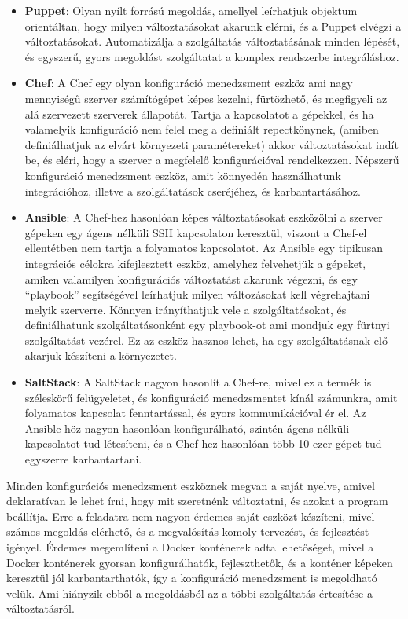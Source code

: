 \documentclass[11pt,magyar,a4paper,twoside,]{report}
\begin{document}
\begin{itemize}
\item
  \textbf{Puppet}\citep{puppet}: Olyan nyílt forrású megoldás, amellyel
  leírhatjuk objektum orientáltan, hogy milyen változtatásokat akarunk
  elérni, és a Puppet elvégzi a változtatásokat. Automatizálja a
  szolgáltatás változtatásának minden lépését, és egyszerű, gyors
  megoldást szolgáltatat a komplex rendszerbe integráláshoz.
\item
  \textbf{Chef}\citep{chef}: A Chef egy olyan konfiguráció menedzsment
  eszköz ami nagy mennyiségű szerver számítógépet képes kezelni,
  fürtözhető, és megfigyeli az alá szervezett szerverek állapotát.
  Tartja a kapcsolatot a gépekkel, és ha valamelyik konfiguráció nem
  felel meg a definiált repectkönynek, (amiben definiálhatjuk az elvárt
  környezeti paramétereket) akkor változtatásokat indít be, és eléri,
  hogy a szerver a megfelelő konfigurációval rendelkezzen. Népszerű
  konfiguráció menedzsment eszköz, amit könnyedén használhatunk
  integrációhoz, illetve a szolgáltatások cseréjéhez, és
  karbantartásához.
\item
  \textbf{Ansible}\citep{ansible}: A Chef-hez hasonlóan képes
  változtatásokat eszközölni a szerver gépeken egy ágens nélküli SSH
  kapcsolaton keresztül, viszont a Chef-el ellentétben nem tartja a
  folyamatos kapcsolatot. Az Ansible egy tipikusan integrációs célokra
  kifejlesztett eszköz, amelyhez felvehetjük a gépeket, amiken
  valamilyen konfigurációs változtatást akarunk végezni, és egy
  ``playbook'' segítségével leírhatjuk milyen változásokat kell
  végrehajtani melyik szerverre. Könnyen irányíthatjuk vele a
  szolgáltatásokat, és definiálhatunk szolgáltatásonként egy playbook-ot
  ami mondjuk egy fürtnyi szolgáltatást vezérel. Ez az eszköz hasznos
  lehet, ha egy szolgáltatásnak elő akarjuk készíteni a környezetet.
\item
  \textbf{SaltStack}\citep{saltstack}: A SaltStack nagyon hasonlít a
  Chef-re, mivel ez a termék is széleskörű felügyeletet, és konfiguráció
  menedzsmentet kínál számunkra, amit folyamatos kapcsolat
  fenntartással, és gyors kommunikációval ér el. Az Ansible-höz nagyon
  hasonlóan konfigurálható, szintén ágens nélküli kapcsolatot tud
  létesíteni, és a Chef-hez hasonlóan több 10 ezer gépet tud egyszerre
  karbantartani.
\end{itemize}

Minden konfigurációs menedzsment eszköznek megvan a saját nyelve, amivel
deklaratívan le lehet írni, hogy mit szeretnénk változtatni, és azokat a
program beállítja. Erre a feladatra nem nagyon érdemes saját eszközt
készíteni, mivel számos megoldás elérhető, és a megvalósítás komoly
tervezést, és fejlesztést igényel. Érdemes megemlíteni a Docker
konténerek adta lehetőséget, mivel a Docker konténerek gyorsan
konfigurálhatók, fejleszthetők, és a konténer képeken keresztül jól
karbantarthatók, így a konfiguráció menedzsment is megoldható velük. Ami
hiányzik ebből a megoldásból az a többi szolgáltatás értesítése a
változtatásról.
\end{document}
